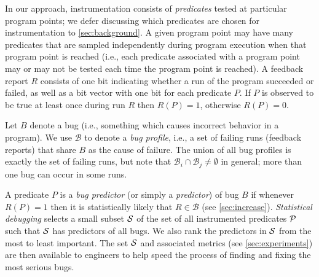 \documentclass[preprint,final]{sigplanconf}
\newcommand{\bug}{\ensuremath{B}}
\newcommand{\bugprofile}{\ensuremath{\mathcal{B}}}
\newcommand{\termdef}[1]{\emph{#1}}
\newcommand{\report}[1]{\ensuremath{R(#1)}}
\begin{document}
In our approach, instrumentation consists of \termdef{predicates} tested
at particular program points; we defer discussing which predicates are
chosen for instrumentation to \autoref{sec:background}.  A given
program point may have many predicates that are sampled independently
during program execution when that program point is reached (i.e.,
each predicate associated with a program point may or may not be
tested each time the program point is reached).  A feedback report $R$
consists of one bit indicating whether a run of the program
succeeded or failed, as well as a bit vector with one bit for each
predicate $P$.  If $P$ is observed to be true at least once during run
$R$ then $\report{P} = 1$, otherwise $\report{P} = 0$.

Let $\bug$ denote a bug (i.e., something which causes incorrect
behavior in a program).  We use $\bugprofile$ to denote a \termdef{bug
profile}, i.e., a set of failing runs (feedback reports) that share
$\bug$ as the cause of failure.  The union of all bug profiles is
exactly the set of failing runs, but note that $\bugprofile_i \cap
\bugprofile_j \neq
\emptyset$ in general; more than one bug can occur in some runs.

A predicate $P$ is a \termdef{bug predictor} (or simply a
\termdef{predictor}) of bug $\bug$ if whenever $\report{P} = 1$
then it is statistically likely that $R \in \bugprofile$ (see
\autoref{sec:increase}).  \termdef{Statistical debugging} selects a
small subset ${\cal S}$ of the set of all instrumented predicates ${\cal P}$ such
that ${\cal S}$ has predictors of all bugs.  We also rank the
predictors in ${\cal S}$ from the most to least important.  The set
${\cal S}$ and associated metrics (see
\autoref{sec:experiments}) are then available to engineers to help
speed the process of finding and fixing the most serious bugs.
\end{document}
